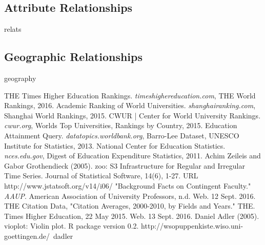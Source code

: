 \documentclass[12pt]{article}
\begin{document}
\subsection{Attribute Relationships}
relats

\subsection{Geographic Relationships}
geography

\begin{thebibliography}{9} 

 THE Times Higher Education Rankings. \textit{timeshighereducation.com}, THE World Rankings, 2016.
 Academic Ranking of World Universities. \textit{shanghairanking.com}, Shanghai World Rankings, 2015.
 CWUR | Center for World University Rankings. \textit{cwur.org}, Worlds Top Universities, Rankings by Country, 2015.
 Education Attainment Query. \textit{datatopics.worldbank.org}, Barro-Lee Dataset, UNESCO Institute for Statistics, 2013.
 National Center for Education Statistics. \textit{nces.edu.gov}, Digest of Education Expenditure Statistics, 2011.
 Achim Zeileis and Gabor Grothendieck (2005). zoo: S3 Infrastructure for Regular and Irregular Time Series. Journal of Statistical Software,
  14(6), 1-27. URL http://www.jstatsoft.org/v14/i06/
 "Background Facts on Contingent Faculty." \textit{AAUP}. American Association of University Professors, n.d. Web. 12 Sept. 2016.
 THE Citation Data, "Citation Averages, 2000-2010, by Fields and Years." THE. Times Higher Education, 22 May 2015. Web. 13 Sept. 2016.
 Daniel Adler (2005). vioplot: Violin plot. R package version 0.2. http://wsopuppenkiste.wiso.uni-goettingen.de/~dadler
\end{thebibliography} 
\end{document}
